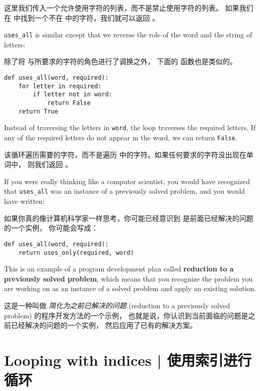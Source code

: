 这里我们传入一个允许使用字符的列表，而不是禁止使用字符的列表。
如果我们在  中找到一个不在  中的字符，我们就可以返回  。

\verb"uses_all" is similar except that we reverse the role
of the word and the string of letters:

除了将  与所要求的字符的角色进行了调换之外，
下面的  函数也是类似的。

\begin{lstlisting}
def uses_all(word, required):
    for letter in required:
        if letter not in word:
            return False
    return True
\end{lstlisting}

%
Instead of traversing the letters in {\tt word}, the loop
traverses the required letters.  If any of the required letters
do not appear in the word, we can return {\tt False}.

该循环遍历需要的字符，而不是遍历  中的字符。如果任何要求的字符没出现在单词中， 则我们返回  。


If you were really thinking like a computer scientist, you would
have recognized that \verb"uses_all" was an instance of a
previously solved problem, and you would have written:

如果你真的像计算机科学家一样思考，你可能已经意识到  是前面已经解决的问题的一个实例， 你可能会写成：

\begin{lstlisting}
def uses_all(word, required):
    return uses_only(required, word)
\end{lstlisting}
%
This is an example of a program development plan called {\bf
  reduction to a previously solved problem}, which means that you
recognize the problem you are working on as an instance of a solved
problem and apply an existing solution.   

这是一种叫做 {\em 简化为之前已解决的问题} (reduction to a
previously solved problem) 的程序开发方法的一个示例，
也就是说，你认识到当前面临的问题是之前已经解决的问题的一个实例，
然后应用了已有的解决方案。


\section{Looping with indices  |  使用索引进行循环}
  

